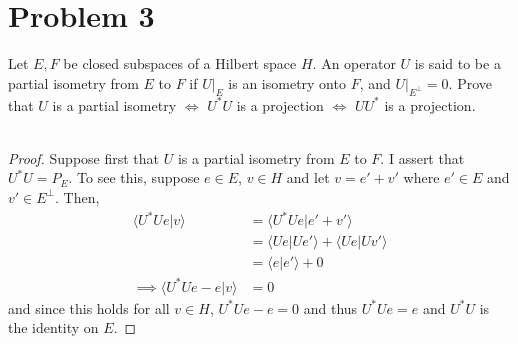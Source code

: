 \documentclass[fontsize=11pt]{scrartcl} %
\numberwithin{equation}{section} %
\numberwithin{figure}{section} %
\numberwithin{table}{section} %
\begin{document}
\newpage

\section*{Problem 3}
Let $E,F$ be closed subspaces of a Hilbert space $H$. An operator $U$ is said to
be a partial isometry from $E$ to $F$ if $U|_E$ is an isometry onto $F$, and
$U|_{E^{\perp}}=0$.
Prove that $U$ is a partial isometry $\iff$ $U^*U$ is a projection $\iff$ $UU^*$
is a projection.
\\
\\
\begin{proof}
    Suppose first that $U$ is a partial isometry from $E$ to $F$. I assert that
    $U^*U = P_E$. To see this, suppose $e\in E$, $v\in H$ and let $v=e'+v'$
    where $e'\in E$ and $v'\in E^{\perp}$. Then,
    \[
        \begin{aligned}
            \langle U^*Ue|v\rangle &= \langle U^*Ue|e'+v'\rangle\\
            &= \langle Ue|Ue'\rangle + \langle Ue|Uv'\rangle\\
            &= \langle e|e'\rangle + 0\\
            \implies \langle U^*Ue-e|v\rangle&=0
        \end{aligned}
    \]
    and since this holds for all $v\in H$, $U^*Ue-e=0$ and thus $U^*Ue=e$ and
    $U^*U$ is the identity on $E$.


\end{proof}
\end{document}
